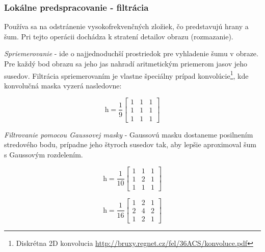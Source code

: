 \subsubsection{Lokálne predspracovanie - filtrácia}
Používa sa na odstránenie vysokofrekvenčných zložiek, čo predstavujú hrany a šum. Pri tejto operácii dochádza k stratení detailov obrazu (rozmazanie). \cite{Detekcia_a_rozpoznavanie_objektov}

\textit{Spriemerovanie} - ide o najjednoduchší prostriedok pre vyhladenie šumu v obraze. Pre každý bod obrazu sa jeho jas nahradí aritmetickým priemerom jasov jeho susedov. Filtrácia spriemerovaním je vlastne špeciálny prípad konvolúcie\footnote{Diskrétna 2D konvolucia \url{http://bruxy.regnet.cz/fel/36ACS/konvoluce.pdf}}, kde konvolučná maska vyzerá nasledovne: \cite{Detekcia_a_rozpoznavanie_objektov}

\begin{equation}
    \textit{h}=\frac{1}{9}\begin{bmatrix} 1 & 1 & 1 \\ 1 & 1 & 1 \\ 1 & 1 & 1  \end{bmatrix}
\end{equation}

\textit{Filtrovanie pomocou Gaussovej masky} - Gaussovú masku dostaneme posilnením stredového bodu, prípadne jeho štyroch susedov tak, aby lepšie aproximoval šum s Gaussovým rozdelením. \cite{Detekcia_a_rozpoznavanie_objektov}


\begin{figure}[H]
    \centering
    \begin{minipage}[b]{0.49\textwidth}
        \begin{equation}
            \textit{h}=\frac{1}{10}\begin{bmatrix} 1 & 1 & 1 \\ 1 & 2 & 1 \\ 1 & 1 & 1  \end{bmatrix}
        \end{equation}
    \end{minipage}
    \hfill
    \begin{minipage}[b]{0.49\textwidth}
        \begin{equation}
            \textit{h}=\frac{1}{16}\begin{bmatrix} 1 & 2 & 1 \\ 2 & 4 & 2 \\ 1 & 2 & 1  \end{bmatrix}
        \end{equation}
    \end{minipage}
\end{figure}


